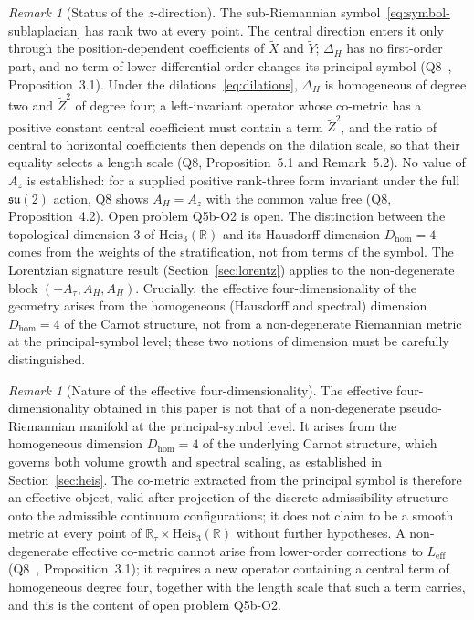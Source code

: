 \documentclass[11pt,a4paper]{article}
\theoremstyle{definition}
\theoremstyle{remark}
\newtheorem{remark}[theorem]{Remark}
\newcommand{\HeisR}{\mathrm{Heis}_3(\mathbb{R})}
\newcommand{\DeltaH}{\Delta_H}
\newcommand{\Dhom}{D_{\mathrm{hom}}}
\begin{document}
    \begin{remark}[Status of the $z$-direction]
      \label{rem:zdirection}
      The sub-Riemannian symbol~\eqref{eq:symbol-sublaplacian} has rank two at every point.
      The central direction enters it only through the position-dependent coefficients of $\tilde X$ and $\tilde Y$;
      $\DeltaH$ has no first-order part, and no term of lower differential order changes its principal symbol
      (Q8~\cite{BeauQ8}, Proposition~3.1).
      Under the dilations~\eqref{eq:dilations}, $\DeltaH$ is homogeneous of degree two and $\tilde Z^2$ of degree four;
      a left-invariant operator whose co-metric has a positive constant central coefficient must contain a term
      $\tilde Z^2$, and the ratio of central to horizontal coefficients then depends on the dilation scale, so that
      their equality selects a length scale (Q8, Proposition~5.1 and Remark~5.2).
      No value of $A_z$ is established: for a supplied positive rank-three form invariant under the full
      $\mathfrak{su}(2)$ action, Q8 shows $A_H = A_z$ with the common value free (Q8, Proposition~4.2).
      Open problem Q5b-O2 is open.
      The distinction between the topological dimension $3$ of $\HeisR$ and its Hausdorff dimension $\Dhom = 4$
      comes from the weights of the stratification, not from terms of the symbol.
      The Lorentzian signature result (Section~\ref{sec:lorentz}) applies to the non-degenerate block
      $(-A_\tau, A_H, A_H)$.
      Crucially, the effective four-dimensionality of the geometry arises from the homogeneous
      (Hausdorff and spectral) dimension $\Dhom = 4$ of the Carnot structure, not from a
      non-degenerate Riemannian metric at the principal-symbol level; these two notions of
      dimension must be carefully distinguished.
    \end{remark}

    \begin{remark}[Nature of the effective four-dimensionality]
      \label{rem:eff4d}
      The effective four-dimensionality obtained in this paper is not that of a
      non-degenerate pseudo-Riemannian manifold at the principal-symbol level.
      It arises from the homogeneous dimension $\Dhom = 4$ of the underlying Carnot
      structure, which governs both volume growth and spectral scaling, as established
      in Section~\ref{sec:heis}.
      The co-metric extracted from the principal symbol is therefore an effective
      object, valid after projection of the discrete admissibility structure onto the
      admissible continuum configurations; it does not claim to be a smooth metric at
      every point of $\mathbb{R}_\tau \times \HeisR$ without further hypotheses.
      A non-degenerate effective co-metric cannot arise from lower-order corrections to
      $L_{\mathrm{eff}}$ (Q8~\cite{BeauQ8}, Proposition~3.1); it requires a new operator containing a central term
      of homogeneous degree four, together with the length scale that such a term carries, and this is the
      content of open problem Q5b-O2.
    \end{remark}
\end{document}
